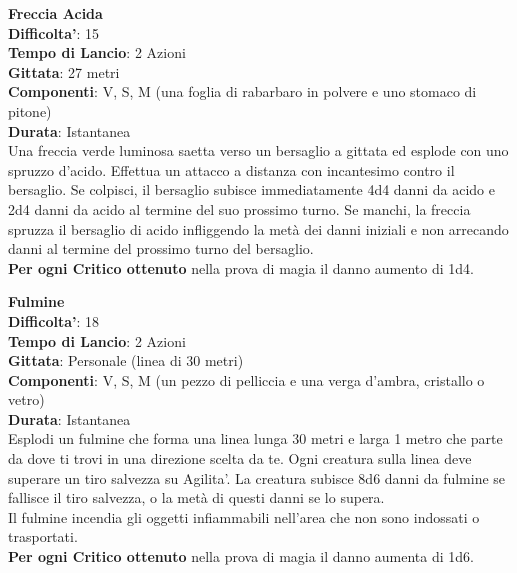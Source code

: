 \begin{multicols}{2}
\medskip\textbf{Freccia Acida}\\
\textbf{Difficolta'}: 15\\
\textbf{Tempo di Lancio}: 2 Azioni\\
\textbf{Gittata}: 27 metri\\
\textbf{Componenti}: V, S, M (una foglia di rabarbaro in polvere e uno stomaco di pitone)\\
\textbf{Durata}: Istantanea\\
Una freccia verde luminosa saetta verso un bersaglio a gittata ed esplode con uno spruzzo d’acido. Effettua un attacco a distanza con incantesimo contro il bersaglio. Se colpisci, il bersaglio subisce immediatamente 4d4 danni da acido e 2d4 danni da acido al termine del suo prossimo turno. Se manchi, la freccia spruzza il bersaglio di acido infliggendo la metà dei danni iniziali e non arrecando danni al termine del prossimo turno del bersaglio.\\
\textbf{Per ogni Critico ottenuto} nella prova di magia il danno aumento di 1d4.

\medskip\textbf{Fulmine}\\
\textbf{Difficolta'}: 18\\
\textbf{Tempo di Lancio}: 2 Azioni\\
\textbf{Gittata}: Personale (linea di 30 metri)\\
\textbf{Componenti}: V, S, M (un pezzo di pelliccia e una verga d’ambra, cristallo o vetro)\\
\textbf{Durata}: Istantanea\\
Esplodi un fulmine che forma una linea lunga 30 metri e larga 1 metro che parte da dove ti trovi in una direzione scelta da te. Ogni creatura sulla linea deve superare un tiro salvezza su Agilita'. La creatura subisce 8d6 danni da fulmine se fallisce il tiro salvezza, o la metà di questi danni se lo supera.\\
Il fulmine incendia gli oggetti infiammabili nell’area che non sono indossati o trasportati. \\
\textbf{Per ogni Critico ottenuto} nella prova di magia il danno aumenta di 1d6.


\end{multicols}
